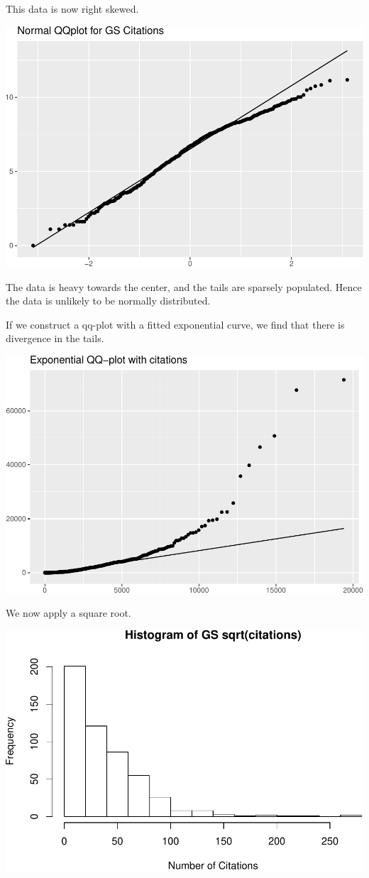 \documentclass[]{article}
\begin{document}
This data is now right skewed.

\includegraphics{final_files/figure-latex/unnamed-chunk-6-1.pdf}

The data is heavy towards the center, and the tails are sparsely
populated. Hence the data is unlikely to be normally distributed.

If we construct a qq-plot with a fitted exponential curve, we find that
there is divergence in the tails.

\includegraphics{final_files/figure-latex/unnamed-chunk-7-1.pdf}

We now apply a square root.

\includegraphics{final_files/figure-latex/unnamed-chunk-8-1.pdf}
\end{document}
